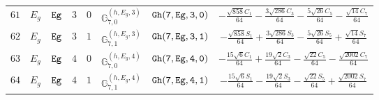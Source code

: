\documentclass[fleqn,8pt]{jsarticle}
\begin{document}
\begin{table}[ht!]
\begin{center}
\begin{tabular}{cccccccc}
$ 61 $ & $ E_{g} $ & $ {\tt Eg} $ & $ 3 $ & $ 0 $ & $ \mathbb{G}_{7,0}^{(h,E_{g},3)} $ & $ {\tt Gh(7,Eg,3,0)} $ & $ - \frac{\sqrt{858} C_{1}}{64} - \frac{3 \sqrt{286} C_{3}}{64} - \frac{5 \sqrt{26} C_{5}}{64} - \frac{\sqrt{14} C_{7}}{64} $ \\
$ 62 $ & $ E_{g} $ & $ {\tt Eg} $ & $ 3 $ & $ 1 $ & $ \mathbb{G}_{7,1}^{(h,E_{g},3)} $ & $ {\tt Gh(7,Eg,3,1)} $ & $ - \frac{\sqrt{858} S_{1}}{64} + \frac{3 \sqrt{286} S_{3}}{64} - \frac{5 \sqrt{26} S_{5}}{64} + \frac{\sqrt{14} S_{7}}{64} $ \\
$ 63 $ & $ E_{g} $ & $ {\tt Eg} $ & $ 4 $ & $ 0 $ & $ \mathbb{G}_{7,0}^{(h,E_{g},4)} $ & $ {\tt Gh(7,Eg,4,0)} $ & $ - \frac{15 \sqrt{6} C_{1}}{64} + \frac{19 \sqrt{2} C_{3}}{64} - \frac{\sqrt{22} C_{5}}{64} - \frac{\sqrt{2002} C_{7}}{64} $ \\
$ 64 $ & $ E_{g} $ & $ {\tt Eg} $ & $ 4 $ & $ 1 $ & $ \mathbb{G}_{7,1}^{(h,E_{g},4)} $ & $ {\tt Gh(7,Eg,4,1)} $ & $ - \frac{15 \sqrt{6} S_{1}}{64} - \frac{19 \sqrt{2} S_{3}}{64} - \frac{\sqrt{22} S_{5}}{64} + \frac{\sqrt{2002} S_{7}}{64} $ \\
 \hline \hline
\end{tabular}
\end{center}
\end{table}
\end{document}
